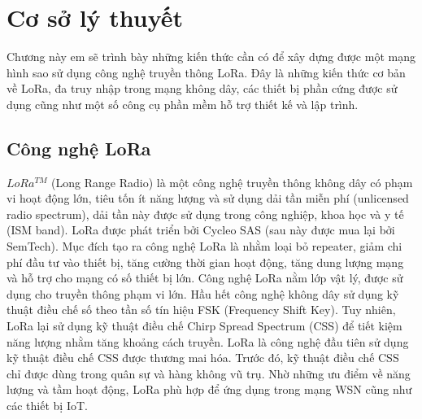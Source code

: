 \chapter{Cơ sở lý thuyết}
\label{chapter2}
Chương này em sẽ trình bày những kiến thức cần có để xây dựng được một mạng hình sao sử dụng công nghệ truyền thông LoRa. Đây là những kiến thức cơ bản về LoRa, đa truy nhập trong mạng không dây, các thiết bị phần cứng được sử dụng cũng như một số công cụ phần mềm hỗ trợ thiết kế và lập trình.
\section{Công nghệ LoRa}  
$LoRa^{TM}$ (Long Range Radio) \cite{2} là một công nghệ truyền thông không dây có phạm vi hoạt động lớn, tiêu tốn ít năng lượng và sử dụng dải tần miễn phí (unlicensed radio spectrum), dải tần này được sử dụng trong công nghiệp, khoa học và y tế (ISM band). LoRa được phát triển bởi Cycleo SAS (sau này được mua lại bởi SemTech). Mục đích tạo ra công nghệ LoRa là nhằm loại bỏ repeater, giảm chi phí đầu tư vào thiết bị, tăng cường thời gian hoạt động, tăng dung lượng mạng và hỗ trợ cho mạng có số thiết bị lớn. Công nghệ LoRa nằm lớp vật lý, được sử dụng cho truyền thông phạm vi lớn. Hầu hết công nghệ không dây sử dụng kỹ thuật điều chế số theo tần số tín hiệu FSK (Frequency Shift Key). Tuy nhiên, LoRa lại sử dụng kỹ thuật điều chế Chirp Spread Spectrum (CSS) để tiết kiệm năng lượng nhằm tăng khoảng cách truyền. LoRa là công nghệ đầu tiên sử dụng kỹ thuật điều chế CSS được thương mai hóa. Trước đó, kỹ thuật điều chế CSS chỉ được dùng trong quân sự và hàng không vũ trụ. Nhờ những ưu điểm về năng lượng và tầm hoạt động, LoRa phù hợp để ứng dụng trong mạng WSN cũng như các thiết bị IoT.
